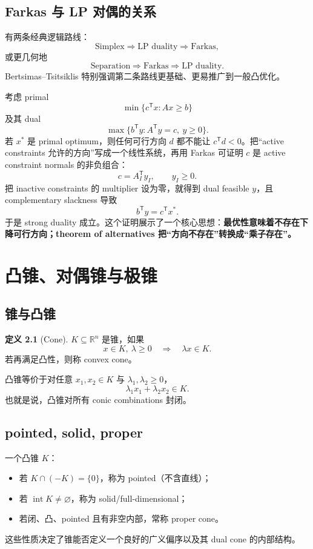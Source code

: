 \documentclass[11pt,a4paper,openany]{ctexrep}
\theoremstyle{definition}
\newtheorem{definition}[theorem]{定义}
\newcommand{\R}{\mathbb{R}}
\newcommand{\interior}{\operatorname{int}}
\newcommand{\transpose}{\mathsf{T}}
\begin{document}
\section{Farkas 与 LP 对偶的关系}
有两条经典逻辑路线：
\[
\text{Simplex}\Rightarrow\text{LP duality}\Rightarrow\text{Farkas},
\]
或更几何地
\[
\text{Separation}\Rightarrow\text{Farkas}\Rightarrow\text{LP duality}.
\]
Bertsimas--Tsitsiklis 特别强调第二条路线更基础、更易推广到一般凸优化。\cite[\S4.7]{bertsimas}


\begin{deepdivebox}
考虑 primal
\[
\min\{c^\transpose x:Ax\ge b\}
\]
及其 dual
\[
\max\{b^\transpose y:A^\transpose y=c,\ y\ge0\}.
\]
若 $x^*$ 是 primal optimum，则任何可行方向 $d$ 都不能让 $c^\transpose d<0$。把“active constraints 允许的方向”写成一个线性系统，再用 Farkas 可证明 $c$ 是 active constraint normals 的非负组合：
\[
c=A_I^\transpose y_I,\qquad y_I\ge0.
\]
把 inactive constraints 的 multiplier 设为零，就得到 dual feasible $y$，且 complementary slackness 导致
\[
b^\transpose y=c^\transpose x^*.
\]
于是 strong duality 成立。这个证明展示了一个核心思想：\textbf{最优性意味着不存在下降可行方向；theorem of alternatives 把“方向不存在”转换成“乘子存在”。}
\cite[\S4.7]{bertsimas}
\end{deepdivebox}

\chapter{凸锥、对偶锥与极锥}

\section{锥与凸锥}

\begin{definition}[Cone]
$K\subseteq\R^n$ 是锥，如果
\[
x\in K,\ \lambda\ge0\quad\Longrightarrow\quad\lambda x\in K.
\]
若再满足凸性，则称 convex cone。
\end{definition}

凸锥等价于对任意 $x_1,x_2\in K$ 与 $\lambda_1,\lambda_2\ge0$，
\[
\lambda_1x_1+\lambda_2x_2\in K.
\]
也就是说，凸锥对所有 conic combinations 封闭。

\section{pointed, solid, proper}
一个凸锥 $K$：
\begin{itemize}[leftmargin=2em]
  \item 若 $K\cap(-K)=\{0\}$，称为 pointed（不含直线）；
  \item 若 $\interior K\ne\varnothing$，称为 solid/full-dimensional；
  \item 若闭、凸、pointed 且有非空内部，常称 proper cone。
\end{itemize}
这些性质决定了锥能否定义一个良好的广义偏序以及其 dual cone 的内部结构。
\end{document}
